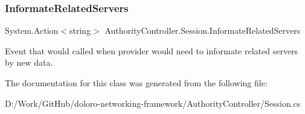 \subsubsection{\texorpdfstring{Informate\+Related\+Servers}{InformateRelatedServers}}
{\footnotesize\ttfamily System.\+Action$<$string$>$ Authority\+Controller.\+Session.\+Informate\+Related\+Servers\hspace{0.3cm}{\ttfamily [static]}}



Event that would called when provider would need to informate related servers by new data. 



The documentation for this class was generated from the following file\+:\begin{DoxyCompactItemize}
\item 
D\+:/\+Work/\+Git\+Hub/doloro-\/networking-\/framework/\+Authority\+Controller/Session.\+cs\end{DoxyCompactItemize}
